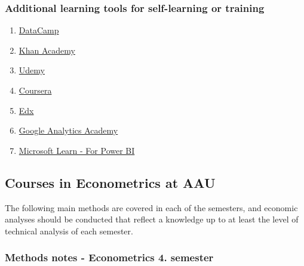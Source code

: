 \documentclass[
]{book}
\providecommand{\tightlist}{%
  \setlength{\itemsep}{0pt}\setlength{\parskip}{0pt}}
\begin{document}
\hypertarget{additional-learning-tools-for-self-learning-or-training}{%
\subsubsection{Additional learning tools for self-learning or training}\label{additional-learning-tools-for-self-learning-or-training}}

\begin{enumerate}
\def\labelenumi{\arabic{enumi}.}
\tightlist
\item
  \href{https://www.datacamp.com}{DataCamp}
\item
  \href{https://www.khanacademy.org}{Khan Academy}
\item
  \href{https://www.udemy.com}{Udemy}
\item
  \href{https://www.coursera.org}{Coursera}
\item
  \href{https://www.edx.org}{Edx}
\item
  \href{https://analytics.google.com/analytics/academy/}{Google Analytics Academy}
\item
  \href{https://docs.microsoft.com/en-gb/learn/powerplatform/power-bi?WT.mc_id=sitertzn_learntab_guidedlearning-card-powerbi}{Microsoft Learn - For Power BI}
\end{enumerate}

\hypertarget{courses-in-econometrics-at-aau}{%
\subsection{Courses in Econometrics at AAU}\label{courses-in-econometrics-at-aau}}

The following main methods are covered in each of the semesters, and economic analyses should be conducted that reflect a knowledge up to at least the level of technical analysis of each semester.

\hypertarget{methods-notes---econometrics-4.-semester}{%
\subsubsection{Methods notes - Econometrics 4. semester}\label{methods-notes---econometrics-4.-semester}}
\end{document}
